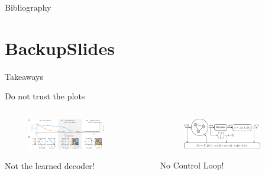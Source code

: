 \documentclass[17pt, t, lualatex]{beamer}
\begin{document}
\AtNextBibliography{\small}
\begin{frame}[allowframebreaks]{Bibliography}
	\printbibliography
\end{frame}











\section*{BackupSlides}\insertsectionpage




\begin{frame}{Takeaways}
	\begin{alertblock}{Do not trust the plots}
		\begin{columns}
			\begin{column}{0.48\textwidth}
				\begin{figure}
					\includegraphics[width= 0.8\textwidth]{figures/fake1.png}
				\end{figure}
			Not the learned decoder! \cite{brendel_learning_2020}
			\end{column}

		\begin{column}{0.48\textwidth}
			\begin{figure}
				\includegraphics[width= 0.8\textwidth]{figures/fake2.png}
			\end{figure}
			No Control Loop! \cite{huang_spiking_2019}
		\end{column}
		\end{columns}
	\end{alertblock}
\end{frame}
\end{document}
